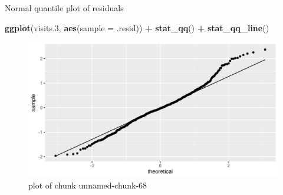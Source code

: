 \documentclass[ignorenonframetext,]{beamer}
\newenvironment{Shaded}{\begin{snugshade}}{\end{snugshade}}
\newcommand{\DataTypeTok}[1]{\textcolor[rgb]{0.13,0.29,0.53}{#1}}
\newcommand{\FloatTok}[1]{\textcolor[rgb]{0.00,0.00,0.81}{#1}}
\newcommand{\KeywordTok}[1]{\textcolor[rgb]{0.13,0.29,0.53}{\textbf{#1}}}
\newcommand{\NormalTok}[1]{#1}
\newcommand{\OperatorTok}[1]{\textcolor[rgb]{0.81,0.36,0.00}{\textbf{#1}}}
\newcommand{\StringTok}[1]{\textcolor[rgb]{0.31,0.60,0.02}{#1}}
\begin{document}
\begin{frame}[fragile]{Normal quantile plot of residuals}
\protect\hypertarget{normal-quantile-plot-of-residuals-1}{}

\begin{Shaded}
\begin{Highlighting}[]
\KeywordTok{ggplot}\NormalTok{(visits}\FloatTok{.3}\NormalTok{, }\KeywordTok{aes}\NormalTok{(}\DataTypeTok{sample =}\NormalTok{ .resid)) }\OperatorTok{+}\StringTok{ }\KeywordTok{stat_qq}\NormalTok{() }\OperatorTok{+}\StringTok{ }\KeywordTok{stat_qq_line}\NormalTok{()}
\end{Highlighting}
\end{Shaded}

\begin{figure}
\centering
\includegraphics{figure/unnamed-chunk-68-1.pdf}
\caption{plot of chunk unnamed-chunk-68}
\end{figure}

\end{frame}
\end{document}
